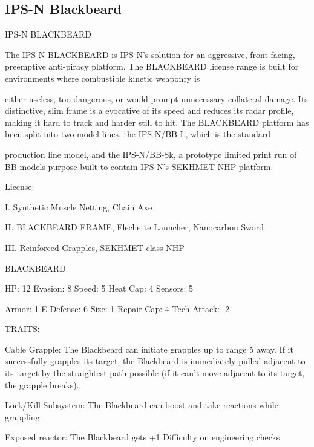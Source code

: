                                                                                                                        
\subsection{IPS-N Blackbeard}

                                         IPS-N BLACKBEARD 
 

The IPS-N BLACKBEARD is IPS-N’s solution for an aggressive, front-facing, preemptive anti-piracy  
platform. The BLACKBEARD license range is built for environments where combustible kinetic weaponry is  

either useless, too dangerous, or would prompt unnecessary collateral damage. Its distinctive, slim frame is  
a evocative of its speed and reduces its radar profile, making it hard to track and harder still to hit. The  
BLACKBEARD platform has been split into two model lines, the IPS-N/BB-L, which is the standard  

production line model, and the IPS-N/BB-Sk, a prototype limited print run of BB models purpose-built to  
contain IPS-N’s SEKHMET NHP platform. 
 
                                                     License:
 
I. Synthetic Muscle Netting, Chain Axe
 
II. BLACKBEARD FRAME, Flechette Launcher, Nanocarbon Sword
 
III. Reinforced Grapples, SEKHMET class NHP
 

                                                BLACKBEARD 

  HP: 12          Evasion: 8                             Speed: 5            Heat Cap: 4        Sensors: 5 

  Armor: 1        E-Defense: 6                           Size: 1             Repair Cap: 4      Tech Attack: -2 

                                                     TRAITS: 

  Cable Grapple: The Blackbeard can initiate grapples up to range 5 away. If it successfully grapples its  
  target, the Blackbeard is immediately pulled adjacent to its target by the straightest path possible (if it  
  can’t move adjacent to its target, the grapple breaks).
 
  Lock/Kill Subsystem: The Blackbeard can boost and take reactions while grappling.
 
  Exposed reactor: The Blackbeard gets +1 Difficulty on engineering checks 

